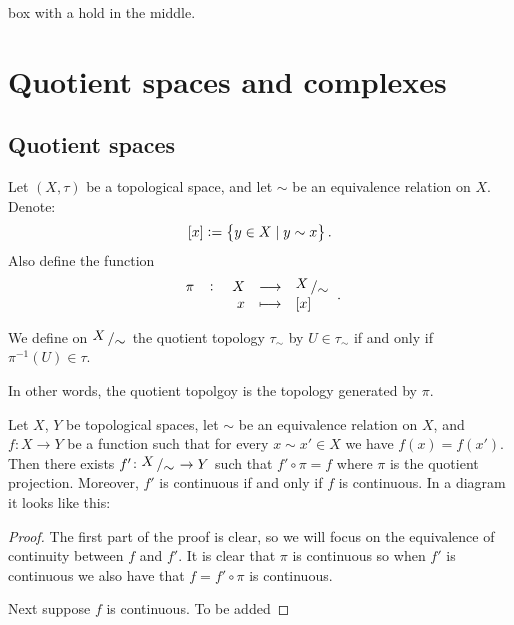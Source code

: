 \documentclass[11pt,a4paper]{article}
\begin{document}
\begin{example}
  box with a hold in the middle.
\end{example}

\newpage

\section{Quotient spaces and complexes}

\subsection{Quotient spaces}

Let $(X, \tau)$ be a topological space, and let $\sim$ be an equivalence
relation on $X$.
Denote:
\[
  [x] := \set{y \in X \mid y \sim x}.
\]
Also define the function
\[
  \fullfunction{\pi}{X}{\bigslant{X}{\sim}}{x}{[x]}.
\]

\begin{definition}
  We define on $\bigslant{X}{\sim}$ the quotient topology $\tau_{\sim}$
  by $U \in \tau_{\sim}$ if and only if $\pi^{-1}(U) \in \tau$.
\end{definition}

In other words, the quotient topolgoy is the topology generated by $\pi$.

\begin{proposition}
  Let $X$, $Y$ be topological spaces, let $\sim$ be an equivalence relation
  on $X$, and $f \colon X \to Y$ be a function such that for every 
  $x \sim x' \in X$ we have $f(x) = f(x')$.
  Then there exists $f' \colon \bigslant{X}{\sim} \to Y$ such that
  $f' \circ \pi = f$ where $\pi$ is the quotient projection.
  Moreover, $f'$ is continuous if and only if $f$ is continuous.
  In a diagram it looks like this:
  \begin{center}
  \end{center}
\end{proposition}
\begin{proof}
  The first part of the proof is clear, so we will focus on the equivalence
  of continuity between $f$ and $f'$.
  It is clear that $\pi$ is continuous so when $f'$ is continuous
  we also have that $f = f' \circ \pi$ is continuous.

  Next suppose $f$ is continuous.
  To be added
\end{proof}
\end{document}
